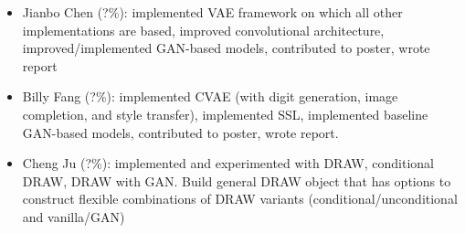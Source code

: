 \documentclass[10pt]{article}
\begin{document}
\begin{itemize}
\item Jianbo Chen (?\%): implemented VAE framework on which all other implementations are based, improved convolutional architecture, improved/implemented GAN-based models, contributed to poster, wrote report
\item Billy Fang (?\%): implemented CVAE (with digit generation, image completion, and style transfer), implemented SSL, implemented baseline GAN-based models, contributed to poster, wrote report.
\item Cheng Ju (?\%): implemented and experimented with DRAW, conditional DRAW, DRAW with GAN. Build general DRAW object that has options to construct flexible combinations of DRAW variants (conditional/unconditional and vanilla/GAN)
\end{itemize}















\nocite{*}
\end{document}
